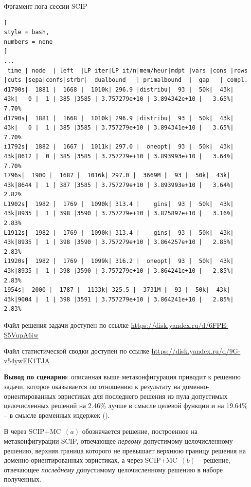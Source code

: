 \documentclass[%
	11pt,
	a4paper,
	utf8,
		]{article}
\begin{document}
Фргамент лога сессии SCIP
\begin{lstlisting}[
style = bash,
numbers = none
]
...
 time | node  | left  |LP iter|LP it/n|mem/heur|mdpt |vars |cons |rows |cuts |sepa|confs|strbr|  dualbound   | primalbound  |  gap   | compl. 
d1790s|  1881 |  1668 |  1010k| 296.9 |distribu|  93 |  50k|  43k|  43k|   0 |  1 | 385 |3585 | 3.757279e+10 | 3.894342e+10 |   3.65%|   7.70%
d1790s|  1881 |  1668 |  1010k| 296.9 |distribu|  93 |  50k|  43k|  43k|   0 |  1 | 385 |3585 | 3.757279e+10 | 3.894341e+10 |   3.65%|   7.70%
i1792s|  1882 |  1667 |  1011k| 297.0 |  oneopt|  93 |  50k|  43k|  43k|8612 |  0 | 385 |3585 | 3.757279e+10 | 3.893993e+10 |   3.64%|   7.70%
1796s|  1900 |  1687 |  1016k| 297.0 |  3669M |  93 |  50k|  43k|  43k|8644 |  1 | 387 |3585 | 3.757279e+10 | 3.893993e+10 |   3.64%|   2.82%
L1902s|  1982 |  1769 |  1090k| 313.4 |    gins|  93 |  50k|  43k|  43k|8935 |  1 | 398 |3590 | 3.757279e+10 | 3.875897e+10 |   3.16%|   2.83%
L1912s|  1982 |  1769 |  1090k| 313.4 |    gins|  93 |  50k|  43k|  43k|8935 |  1 | 398 |3590 | 3.757279e+10 | 3.864257e+10 |   2.85%|   2.83%
i1920s|  1982 |  1769 |  1099k| 316.2 |  oneopt|  93 |  50k|  43k|  43k|8935 |  1 | 398 |3590 | 3.757279e+10 | 3.864241e+10 |   2.85%|   2.83%
1954s|  2000 |  1787 |  1133k| 325.5 |  3731M |  93 |  50k|  43k|  43k|9004 |  1 | 398 |3591 | 3.757279e+10 | 3.864241e+10 |   2.85%|   2.83%
\end{lstlisting}

Файл решения задачи доступен по ссылке \url{https://disk.yandex.ru/d/6FPE-S5VupA6iw}

Файл статистической сводки доступен по ссылке \url{https://disk.yandex.ru/d/9G-v54ywEK1TJA}

\vspace*{3mm}
\textbf{Вывод по сценарию}: описанная выше метаконфигурация приводит к решению задачи, которое оказывается по отношению к результату на доменно-ориентированных эвристиках для последнего решения из пула допустимых целочисленных решений на 2.46\% лучше в смысле целевой функции и на 19.64\% -- в смысле временных издержек ().

В   через SCIP+MC~$ (a) $ обозначается решение, построенное на метаконфигурации SCIP, отвечающее \emph{первому} допустимому целочисленному решению, верхняя граница которого не превышает верхнюю границу решения на доменно-ориентированных эвристиках, а через SCIP+MC~$ (b) $ -- решение, отвечающее \emph{последнему} допустимому целочисленному решению в наборе полученных.
\end{document}
